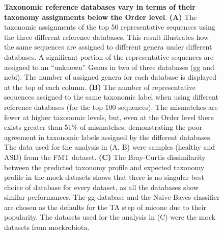 \documentclass[letterpaper,12pt]{article}
\begin{document}
  \begin{figure}[H]
    \centering
    \caption{
      \textbf{Taxonomic reference databases vary in terms of their taxonomy assignments below the Order level}.
      \textbf{(A)} The taxonomic assignments of the top 50 representative sequences using the three different reference databases.
      This result illustrates how the same sequences are assigned to different genera under different databases.
      A significant portion of the representative sequences are assigned to an ``unknown'' Genus in two of three databases (\ac{gg} and \ac{ncbi}).
      The number of assigned genera for each database is displayed at the top of each column.
      \textbf{(B)} The number of representative sequences assigned to the same taxonomic label when using different reference databases (for the top 100 sequences).
      The mismatches are fewer at higher taxonomic levels, but, even at the Order level there exists greater than 51\% of mismatches, demonstrating the poor agreement in taxonomic labels assigned by the different databases.
      The data used for the analysis in (A, B) were samples (healthy and ASD) from the FMT dataset.
      \textbf{(C)} The Bray-Curtis dissimilarity between the predicted taxonomy profile and expected taxonomy profile in the mock datasets shows that there is no singular best choice of database for every dataset, as all the databases show similar performances.
      The \ac{gg} database and the Naive Bayes classifier are chosen as the defaults for the TA step of \ac{micone} due to their popularity.
      The datasets used for the analysis in (C) were the mock datasets from mockrobiota.
    }
    \label{fig:figure3}
  \end{figure}
\end{document}
